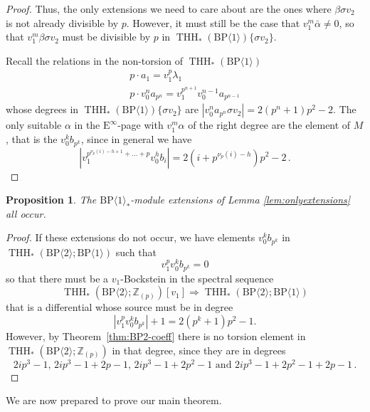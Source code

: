 \documentclass[11pt]{amsart}
\newcommand{\mr}[1]{\mathrm{#1}}
\newcommand{\Z}{\mathbb{Z}}
\newcommand{\BP}{\mr{BP}}
\DeclareMathOperator{\THH}{THH}
\newtheorem{proposition}[equation]{Proposition}
\theoremstyle{definition}
\numberwithin{equation}{section}
\numberwithin{figure}{section}
\begin{document}
\begin{proof}
  Thus, the only extensions we need to care about are the ones where $\beta \sigma v_2$ is not already divisible by $p$. However, it must still be the case that $v_1^m \bar{\alpha} \neq 0$, so that $v_1^m \beta \sigma v_2$ must be divisible by $p$ in $\THH_*(\BP \langle 1 \rangle)\{\sigma v_2\}$.

  Recall the relations in the non-torsion of $\THH_*(\BP \langle 1 \rangle)$
  \[
    \begin{gathered}
      p\cdot a_1 = v_1^p \lambda_1 \\
      p\cdot v_0^n a_{p^n} = v_1^{p^{n+1}}v_0^{n-1} a_{p^{n-1}}
    \end{gathered}
  \]
  whose degrees in $\THH_*(\BP \langle 1 \rangle)\{ \sigma v_2\}$ are $|v_0^n a_{p^n}\sigma v_2| = 2(p^n + 1)p^2 - 2$. The only suitable $\alpha$ in the $\mathrm{E}^\infty$-page with $v_1^m \alpha$ of the right degree are the element of $M$, that is the $v_0^k b_{p^k}$, since in general we have
  \[
    |v_1^{p^{\nu_p(i) - h + 1 } + \dots + p} v_0^h b_i| = 2(i + p^{\nu_p(i) - h})p^2 - 2 \,.
  \]
\end{proof}

\begin{proposition}
  The $\BP\langle 1\rangle_*$-module extensions of Lemma \ref{lem:onlyextensions} all occur. 
\end{proposition}

\begin{proof}
  If these extensions do not occur, we have elements $v_0^k b_{p^k}$ in $\THH_*(\BP \langle 2 \rangle ; \BP \langle 1 \rangle)$ such that
  \[
    v_1^p v_0^k b_{p^k} = 0
  \]
  so that there must be a $v_1$-Bockstein in the spectral sequence
  \[
    \THH_*(\BP \langle 2 \rangle ; \Z_{(p)})[v_1] \Rightarrow \THH_*(\BP \langle 2 \rangle ; \BP \langle 1 \rangle)
  \]
  that is a differential whose source must be in degree
  \[
    |v_1^p v_0^k b_{p^k}| + 1 = 2(p^k + 1)p^2 - 1.
  \]
  However, by Theorem~\ref{thm:BP2-coeff} there is no torsion element in $\THH_*(\BP \langle 2 \rangle; \Z_{(p)})$ in that degree, since they are in degrees
  \[
    2ip^3 - 1 ,\, 2ip^3 - 1 + 2p - 1,\, 2ip^3 - 1 + 2p^2 - 1 \text{ and } 2ip^3 - 1 + 2p^2 - 1 + 2p - 1 \,.
  \]
\end{proof}

We are now prepared to prove our main theorem.
\end{document}
